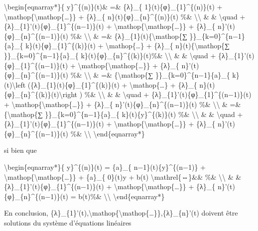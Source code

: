 \documentclass[]{article}
\begin{document}
\textbackslash{}begin\{eqnarray*\}\{ y\}\^{}\{(n)\}(t)\& =\& \{λ\}\_\{
1\}(t)\{φ\}\_\{1\}\^{}\{(n)\}(t) +
\textbackslash{}mathop\{\textbackslash{}mathop\{\ldots{}\}\} + \{λ\}\_\{
n\}(t)\{φ\}\_\{n\}\^{}\{(n)\}(t) \%\& \textbackslash{}\textbackslash{}
\& \& \textbackslash{}quad +
\{λ\}\_\{1\}'(t)\{φ\}\_\{1\}\^{}\{(n−1)\}(t) +
\textbackslash{}mathop\{\textbackslash{}mathop\{\ldots{}\}\} + \{λ\}\_\{
n\}'(t)\{φ\}\_\{n\}\^{}\{(n−1)\}(t) \%\&
\textbackslash{}\textbackslash{} \& =\&
\{λ\}\_\{1\}(t)\{\textbackslash{}mathop\{∑
\}\}\_\{k=0\}\^{}\{n−1\}\{a\}\_\{ k\}(t)\{φ\}\_\{1\}\^{}\{(k)\}(t) +
\textbackslash{}mathop\{\ldots{}\} + \{λ\}\_\{
n\}(t)\{\textbackslash{}mathop\{∑ \}\}\_\{k=0\}\^{}\{n−1\}\{a\}\_\{
k\}(t)\{φ\}\_\{n\}\^{}\{(k)\}(t)\%\& \textbackslash{}\textbackslash{} \&
\& \textbackslash{}quad + \{λ\}\_\{1\}'(t)\{φ\}\_\{1\}\^{}\{(n−1)\}(t) +
\textbackslash{}mathop\{\textbackslash{}mathop\{\ldots{}\}\} + \{λ\}\_\{
n\}'(t)\{φ\}\_\{n\}\^{}\{(n−1)\}(t) \%\&
\textbackslash{}\textbackslash{} \& =\& \{\textbackslash{}mathop\{∑
\}\}\_\{k=0\}\^{}\{n−1\}\{a\}\_\{ k\}(t)\textbackslash{}left
(\{λ\}\_\{1\}(t)\{φ\}\_\{1\}\^{}\{(k)\}(t) +
\textbackslash{}mathop\{\ldots{}\} + \{λ\}\_\{
n\}(t)\{φ\}\_\{n\}\^{}\{(k)\}(t)\textbackslash{}right ) \%\&
\textbackslash{}\textbackslash{} \& \& \textbackslash{}quad +
\{λ\}\_\{1\}'(t)\{φ\}\_\{1\}\^{}\{(n−1)\}(t) +
\textbackslash{}mathop\{\textbackslash{}mathop\{\ldots{}\}\} + \{λ\}\_\{
n\}'(t)\{φ\}\_\{n\}\^{}\{(n−1)\}(t) \%\&
\textbackslash{}\textbackslash{} \& =\& \{\textbackslash{}mathop\{∑
\}\}\_\{k=0\}\^{}\{n−1\}\{a\}\_\{ k\}(t)\{y\}\^{}\{(k)\}(t) \%\&
\textbackslash{}\textbackslash{} \& \& \textbackslash{}quad +
\{λ\}\_\{1\}'(t)\{φ\}\_\{1\}\^{}\{(n−1)\}(t) +
\textbackslash{}mathop\{\textbackslash{}mathop\{\ldots{}\}\} + \{λ\}\_\{
n\}'(t)\{φ\}\_\{n\}\^{}\{(n−1)\}(t) \%\&
\textbackslash{}\textbackslash{} \textbackslash{}end\{eqnarray*\}

si bien que

\textbackslash{}begin\{eqnarray*\}\{ y\}\^{}\{(n)\}(t) = \{a\}\_\{
n−1\}(t)\{y\}\^{}\{(n−1)\} +
\textbackslash{}mathop\{\textbackslash{}mathop\{\ldots{}\}\} + \{a\}\_\{
0\}(t)y + b(t) \textbackslash{}mathrel\{⇔\}\&\& \%\&
\textbackslash{}\textbackslash{} \& \&
\{λ\}\_\{1\}'(t)\{φ\}\_\{1\}\^{}\{(n−1)\}(t) +
\textbackslash{}mathop\{\textbackslash{}mathop\{\ldots{}\}\} + \{λ\}\_\{
n\}'(t)\{φ\}\_\{n\}\^{}\{(n−1)\}(t) = b(t)\%\&
\textbackslash{}\textbackslash{} \textbackslash{}end\{eqnarray*\}

En conclusion,
\{λ\}\_\{1\}'(t),\textbackslash{}mathop\{\textbackslash{}mathop\{\ldots{}\}\},\{λ\}\_\{n\}'(t)
doivent être solutions du système d'équations linéaires
\end{document}
